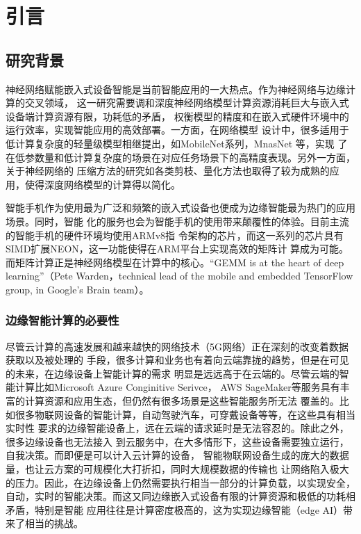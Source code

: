 
\chapter{引言}
\label{cha:intro}

\section{研究背景}

神经网络赋能嵌入式设备智能是当前智能应用的一大热点。作为神经网络与边缘计算的交叉领域，
这一研究需要调和深度神经网络模型计算资源消耗巨大与嵌入式设备端计算资源有限，功耗低的矛盾，
权衡模型的精度和在嵌入式硬件环境中的运行效率，实现智能应用的高效部署。一方面，在网络模型
设计中，很多适用于低计算复杂度的轻量级模型相继提出，如MobileNet系列，MnasNet 等，实现
了在低参数量和低计算复杂度的场景在对应任务场景下的高精度表现。另外一方面，关于神经网络的
压缩方法的研究如各类剪枝、量化方法也取得了较为成熟的应用，使得深度网络模型的计算得以简化。


智能手机作为使用最为广泛和频繁的嵌入式设备也便成为边缘智能最为热门的应用场景。同时，智能
化的服务也会为智能手机的使用带来颠覆性的体验。目前主流的智能手机的硬件环境均使用ARMv8指
令架构的芯片，而这一系列的芯片具有SIMD扩展NEON，这一功能使得在ARM平台上实现高效的矩阵计
算成为可能。而矩阵计算正是神经网络模型在计算中的核心。“GEMM is at the heart of deep
 learning”（Pete Warden，technical lead of the mobile and embedded TensorFlow 
 group, in Google's Brain team）。

\subsection{边缘智能计算的必要性}

尽管云计算的高速发展和越来越快的网络技术（5G网络）正在深刻的改变着数据获取以及被处理的
手段，很多计算和业务也有着向云端靠拢的趋势，但是在可见的未来，在边缘设备上智能计算的需求
明显是远远高于在云端的。尽管云端的智能计算比如Microsoft Azure Conginitive Serivce，
AWS SageMaker等服务具有丰富的计算资源和应用生态，但仍然有很多场景是这些智能服务所无法
覆盖的。比如很多物联网设备的智能计算，自动驾驶汽车，可穿戴设备等等，在这些具有相当实时性
要求的边缘智能设备上，远在云端的请求延时是无法容忍的。除此之外，很多边缘设备也无法接入
到云服务中，在大多情形下，这些设备需要独立运行，自我决策。而即便是可以计入云计算的设备，
智能物联网设备生成的庞大的数据量，也让云方案的可规模化大打折扣，同时大规模数据的传输也
让网络陷入极大的压力。因此，在边缘设备上仍然需要执行相当一部分的计算负载，以实现安全，
自动，实时的智能决策。而这又同边缘嵌入式设备有限的计算资源和极低的功耗相矛盾，特别是智能
应用往往是计算密度极高的，这为实现边缘智能（edge AI）带来了相当的挑战。


